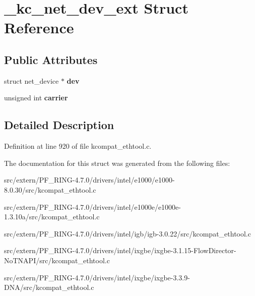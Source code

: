 \hypertarget{struct__kc__net__dev__ext}{
\section{\_\-kc\_\-net\_\-dev\_\-ext Struct Reference}
\label{struct__kc__net__dev__ext}
}
\subsection*{Public Attributes}
\begin{DoxyCompactItemize}
\item 
\hypertarget{struct__kc__net__dev__ext_aad6fb5af8945a43f277ef6743c61d659}{
struct net\_\-device $\ast$ {\bfseries dev}}
\label{struct__kc__net__dev__ext_aad6fb5af8945a43f277ef6743c61d659}

\item 
\hypertarget{struct__kc__net__dev__ext_a0739ecaae6661e894d69b27220938a25}{
unsigned int {\bfseries carrier}}
\label{struct__kc__net__dev__ext_a0739ecaae6661e894d69b27220938a25}

\end{DoxyCompactItemize}


\subsection{Detailed Description}


Definition at line 920 of file kcompat\_\-ethtool.c.



The documentation for this struct was generated from the following files:\begin{DoxyCompactItemize}
\item 
src/extern/PF\_\-RING-\/4.7.0/drivers/intel/e1000/e1000-\/8.0.30/src/kcompat\_\-ethtool.c\item 
src/extern/PF\_\-RING-\/4.7.0/drivers/intel/e1000e/e1000e-\/1.3.10a/src/kcompat\_\-ethtool.c\item 
src/extern/PF\_\-RING-\/4.7.0/drivers/intel/igb/igb-\/3.0.22/src/kcompat\_\-ethtool.c\item 
src/extern/PF\_\-RING-\/4.7.0/drivers/intel/ixgbe/ixgbe-\/3.1.15-\/FlowDirector-\/NoTNAPI/src/kcompat\_\-ethtool.c\item 
src/extern/PF\_\-RING-\/4.7.0/drivers/intel/ixgbe/ixgbe-\/3.3.9-\/DNA/src/kcompat\_\-ethtool.c\end{DoxyCompactItemize}

